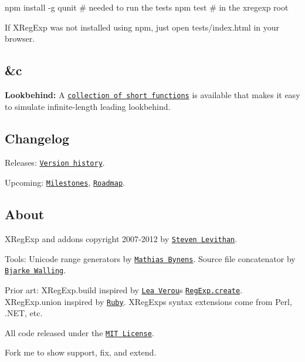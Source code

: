 \begin{DoxyCode}
npm install -g qunit  # needed to run the tests
npm test  # in the xregexp root
\end{DoxyCode}


If X\+Reg\+Exp was not installed using npm, just open {\ttfamily tests/index.\+html} in your browser.

\subsection*{\&c}

{\bfseries Lookbehind\+:} A \href{https://gist.github.com/2387872}{\tt collection of short functions} is available that makes it easy to simulate infinite-\/length leading lookbehind.

\subsection*{Changelog}


\begin{DoxyItemize}
\item Releases\+: \href{http://xregexp.com/history/}{\tt Version history}.
\item Upcoming\+: \href{https://github.com/slevithan/XRegExp/issues/milestones}{\tt Milestones}, \href{https://github.com/slevithan/XRegExp/wiki/Roadmap}{\tt Roadmap}.
\end{DoxyItemize}

\subsection*{About}

X\+Reg\+Exp and addons copyright 2007-\/2012 by \href{http://stevenlevithan.com/}{\tt Steven Levithan}.

Tools\+: Unicode range generators by \href{http://mathiasbynens.be/}{\tt Mathias Bynens}. Source file concatenator by \href{http://twitter.com/walling}{\tt Bjarke Walling}.

Prior art\+: {\ttfamily X\+Reg\+Exp.\+build} inspired by \href{http://lea.verou.me/}{\tt Lea Verou}\textquotesingle{}s \href{http://lea.verou.me/2011/03/create-complex-regexps-more-easily/}{\tt Reg\+Exp.\+create}. {\ttfamily X\+Reg\+Exp.\+union} inspired by \href{http://www.ruby-lang.org/}{\tt Ruby}. X\+Reg\+Exp\textquotesingle{}s syntax extensions come from Perl, .N\+ET, etc.

All code released under the \href{http://mit-license.org/}{\tt M\+IT License}.

Fork me to show support, fix, and extend. 